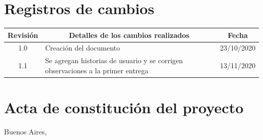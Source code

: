 \documentclass[11pt]{charter}
\begin{document}
\maketitle
\thispagestyle{empty}
\pagebreak


\thispagestyle{empty}
{\setlength{\parskip}{0pt}
\tableofcontents{}
}
\pagebreak


\section{Registros de cambios}
\label{sec:registro}


\begin{table}[ht]
\label{tab:registro}
\centering
\begin{tabularx}{\linewidth}{@{}|c|X|c|@{}}
\hline
\rowcolor[HTML]{C0C0C0} 
Revisión & \multicolumn{1}{c|}{\cellcolor[HTML]{C0C0C0}Detalles de los cambios realizados} & Fecha      \\ \hline
1.0      & Creación del documento                                          & 23/10/2020 \\ \hline
1.1      & Se agregan historias de usuario y se corrigen observaciones a la primer entrega                                 & 13/11/2020 \\ \hline
\end{tabularx}
\end{table}

\pagebreak



\section{Acta de constitución del proyecto}
\label{sec:acta}

\begin{flushright}
Buenos Aires, \fechaInicioName
\end{flushright}

\vspace{2cm}
\end{document}
